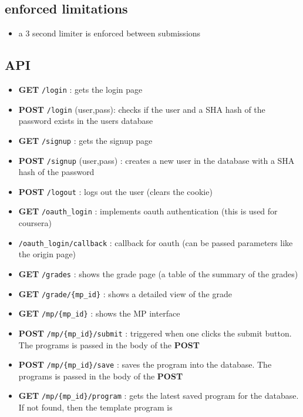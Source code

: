 \subsection{enforced limitations}

\begin{itemize}
\item
  a 3 second limiter is enforced between submissions
\end{itemize}

\subsection{API}

\begin{itemize}
\item
  \textbf{GET} \texttt{/login} : gets the login page
\item
  \textbf{POST} \texttt{/login} (user,pass): checks if the user and a
  SHA hash of the password exists in the users database
\item
  \textbf{GET} \texttt{/signup} : gets the signup page
\item
  \textbf{POST} \texttt{/signup} (user,pass) : creates a new user in the
  database with a SHA hash of the password
\item
  \textbf{POST} \texttt{/logout} : logs out the user (clears the cookie)
\item
  \textbf{GET} \texttt{/oauth\_login} : implements oauth authentication
  (this is used for coursera)
\item
  \texttt{/oauth\_login/callback} : callback for oauth (can be passed
  parameters like the origin page)
\item
  \textbf{GET} \texttt{/grades} : shows the grade page (a table of the
  summary of the grades)
\item
  \textbf{GET} \texttt{/grade/\{mp\_id\}} : shows a detailed view of the
  grade
\item
  \textbf{GET} \texttt{/mp/\{mp\_id\}} : shows the MP interface
\item
  \textbf{POST} \texttt{/mp/\{mp\_id\}/submit} : triggered when one
  clicks the submit button. The programs is passed in the body of the
  \textbf{POST}
\item
  \textbf{POST} \texttt{/mp/\{mp\_id\}/save} : saves the program into
  the database. The programs is passed in the body of the \textbf{POST}
\item
  \textbf{GET} \texttt{/mp/\{mp\_id\}/program} : gets the latest saved
  program for the database. If not found, then the template program is

\end{itemize}
